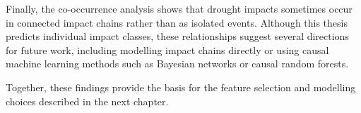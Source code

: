 Finally, the co-occurrence analysis shows that drought impacts sometimes occur in connected impact chains rather than as isolated events. Although this thesis predicts individual impact classes, these relationships suggest several directions for future work, including modelling impact chains directly or using causal machine learning methods such as Bayesian networks or causal random forests.

Together, these findings provide the basis for the feature selection and modelling choices described in the next chapter.





























